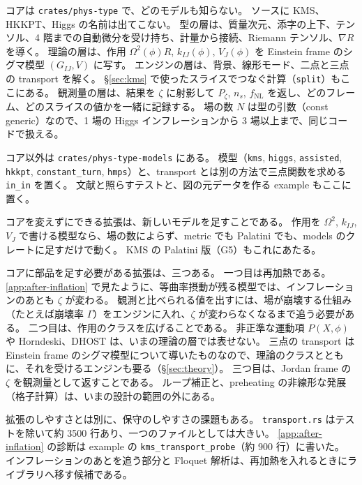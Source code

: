 \documentclass[a4paper,11pt]{ltjsarticle}
\newcommand{\fnl}{f_{\mathrm{NL}}}
\newcommand{\code}[1]{\texttt{#1}}
\begin{document}
コアは \code{crates/phys-type} で、どのモデルも知らない。
ソースに KMS、HKKPT、Higgs の名前は出てこない。
型の層は、質量次元、添字の上下、テンソル、4 階までの自動微分を受け持ち、計量から接続、Riemann テンソル、$\nabla R$ を導く。
理論の層は、作用 $\Omega^2(\phi)R$, $k_{IJ}(\phi)$, $V_J(\phi)$ を Einstein frame のシグマ模型 $(G_{IJ},V)$ に写す。
エンジンの層は、背景、線形モード、二点と三点の transport を解く。
\S\ref{sec:kms} で使ったスライスでつなぐ計算（\code{split}）もここにある。
観測量の層は、結果を $\zeta$ に射影して $P_\zeta$, $n_s$, $\fnl$ を返し、どのフレーム、どのスライスの値かを一緒に記録する。
場の数 $N$ は型の引数（const generic）なので、1 場の Higgs インフレーションから 3 場以上まで、同じコードで扱える。

コア以外は \code{crates/phys-type-models} にある。
模型（\code{kms}, \code{higgs}, \code{assisted}, \code{hkkpt}, \code{constant\_turn}, \code{hmps}）と、transport とは別の方法で三点関数を求める \code{in\_in} を置く。
文献と照らすテストと、図の元データを作る example もここに置く。

コアを変えずにできる拡張は、新しいモデルを足すことである。
作用を $\Omega^2$, $k_{IJ}$, $V_J$ で書ける模型なら、場の数によらず、metric でも Palatini でも、models のクレートに足すだけで動く。
KMS の Palatini 版（G5）もこれにあたる。

コアに部品を足す必要がある拡張は、三つある。
一つ目は再加熱である。
\ref{app:after-inflation} で見たように、等曲率摂動が残る模型では、インフレーションのあとも $\zeta$ が変わる。
観測と比べられる値を出すには、場が崩壊する仕組み（たとえば崩壊率 $\Gamma$\cite{EMST2011,LTBC2012}）をエンジンに入れ、$\zeta$ が変わらなくなるまで追う必要がある。
二つ目は、作用のクラスを広げることである。
非正準な運動項 $P(X,\phi)$ や Horndeski、DHOST は、いまの理論の層では表せない。
三点の transport は Einstein frame のシグマ模型について導いたものなので、理論のクラスとともに、それを受けるエンジンも要る（\S\ref{sec:theory}）。
三つ目は、Jordan frame の $\zeta$ を観測量として返すことである\cite{WMS2012}。
ループ補正と、preheating の非線形な発展（格子計算）は、いまの設計の範囲の外にある。

拡張のしやすさとは別に、保守のしやすさの課題もある。
\code{transport.rs} はテストを除いて約 3500 行あり、一つのファイルとしては大きい。
\ref{app:after-inflation} の診断は example の \code{kms\_transport\_probe}（約 900 行）に書いた。
インフレーションのあとを追う部分と Floquet 解析は、再加熱を入れるときにライブラリへ移す候補である。

\end{document}
